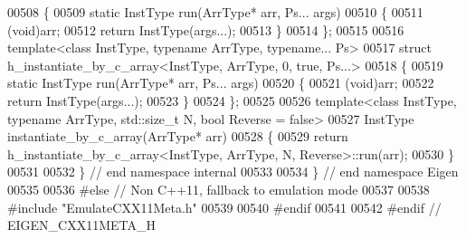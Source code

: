 \begin{DoxyCode}
00508 \{
00509   \textcolor{keyword}{static} InstType run(ArrType* arr, Ps... args)
00510   \{
00511     (void)arr;
00512     \textcolor{keywordflow}{return} InstType(args...);
00513   \}
00514 \};
00515 
00516 \textcolor{keyword}{template}<\textcolor{keyword}{class }InstType, \textcolor{keyword}{typename} ArrType, \textcolor{keyword}{typename}... Ps>
00517 \textcolor{keyword}{struct }h\_instantiate\_by\_c\_array<InstType, ArrType, 0, true, Ps...>
00518 \{
00519   \textcolor{keyword}{static} InstType run(ArrType* arr, Ps... args)
00520   \{
00521     (void)arr;
00522     \textcolor{keywordflow}{return} InstType(args...);
00523   \}
00524 \};
00525 
00526 \textcolor{keyword}{template}<\textcolor{keyword}{class} InstType, \textcolor{keyword}{typename} ArrType, std::\textcolor{keywordtype}{size\_t} N, \textcolor{keywordtype}{bool} Reverse = false>
00527 InstType instantiate\_by\_c\_array(ArrType* arr)
00528 \{
00529   \textcolor{keywordflow}{return} h\_instantiate\_by\_c\_array<InstType, ArrType, N, Reverse>::run(arr);
00530 \}
00531 
00532 \} \textcolor{comment}{// end namespace internal}
00533 
00534 \} \textcolor{comment}{// end namespace Eigen}
00535 
00536 \textcolor{preprocessor}{#else // Non C++11, fallback to emulation mode}
00537 
00538 \textcolor{preprocessor}{#include "EmulateCXX11Meta.h"}
00539 
00540 \textcolor{preprocessor}{#endif}
00541 
00542 \textcolor{preprocessor}{#endif // EIGEN\_CXX11META\_H}
\end{DoxyCode}
